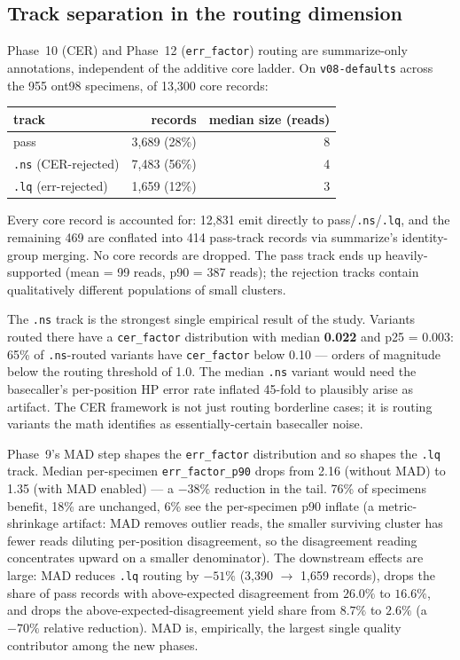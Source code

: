 \documentclass[11pt]{article}
\begin{document}
\subsection{Track separation in the routing dimension}
\label{sec:results-routing}

Phase~10 (CER) and Phase~12 (\texttt{err\_factor}) routing are
summarize-only annotations, independent of the additive core ladder. On
\texttt{v08-defaults} across the 955 ont98 specimens, of 13,300 core
records:

\begin{center}
\begin{tabular}{lrr}
\toprule
track & records & median size (reads) \\
\midrule
pass & 3,689 (28\%) & 8 \\
\texttt{.ns} (CER-rejected) & 7,483 (56\%) & 4 \\
\texttt{.lq} (err-rejected) & 1,659 (12\%) & 3 \\
\bottomrule
\end{tabular}
\end{center}

Every core record is accounted for: 12,831 emit directly to
pass/\texttt{.ns}/\texttt{.lq}, and the remaining 469 are conflated into
414 pass-track records via summarize's identity-group merging. No core
records are dropped. The pass track ends up heavily-supported (mean = 99
reads, p90 = 387 reads); the rejection tracks contain qualitatively
different populations of small clusters.

The \texttt{.ns} track is the strongest single empirical result of the
study. Variants routed there have a \texttt{cer\_factor} distribution
with median \textbf{0.022} and p25 = 0.003: 65\% of \texttt{.ns}-routed
variants have \texttt{cer\_factor} below 0.10 --- orders of magnitude
below the routing threshold of 1.0. The median \texttt{.ns} variant
would need the basecaller's per-position HP error rate inflated 45-fold
to plausibly arise as artifact. The CER framework is not just routing
borderline cases; it is routing variants the math identifies as
essentially-certain basecaller noise.

Phase~9's MAD step shapes the \texttt{err\_factor} distribution and so
shapes the \texttt{.lq} track. Median per-specimen
\texttt{err\_factor\_p90} drops from 2.16 (without MAD) to 1.35 (with
MAD enabled) --- a $-38\%$ reduction in the tail. 76\% of specimens
benefit, 18\% are unchanged, 6\% see the per-specimen p90 inflate (a
metric-shrinkage artifact: MAD removes outlier reads, the smaller
surviving cluster has fewer reads diluting per-position disagreement, so
the disagreement reading concentrates upward on a smaller denominator).
The downstream effects are large: MAD reduces \texttt{.lq} routing by
$-51\%$ (3,390 $\to$ 1,659 records), drops the share of pass records with
above-expected disagreement from $26.0\%$ to $16.6\%$, and drops the
above-expected-disagreement yield share from $8.7\%$ to $2.6\%$ (a
$-70\%$ relative reduction). MAD is, empirically, the largest single
quality contributor among the new phases.
\end{document}
